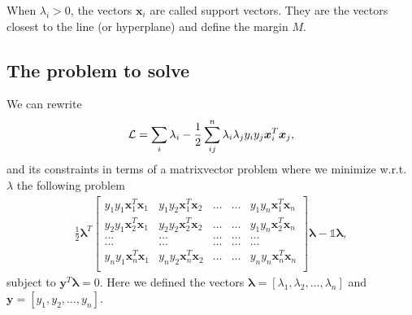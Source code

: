\documentclass[letterpaper,10pt,english]{sphinxmanual}
\begin{document}
When \(\lambda_i > 0\), the vectors \(\boldsymbol{x}_i\) are called support vectors. They are the vectors closest to the line (or hyperplane) and define the margin \(M\).


\subsection{The problem to solve}
\label{\detokenize{chapter7:the-problem-to-solve}}
We can rewrite
\begin{equation*}
\begin{split}
{\cal L}=\sum_i\lambda_i-\frac{1}{2}\sum_{ij}^n\lambda_i\lambda_jy_iy_j\boldsymbol{x}_i^T\boldsymbol{x}_j,
\end{split}
\end{equation*}
and its constraints in terms of a matrix\sphinxhyphen{}vector problem where we minimize w.r.t. \(\lambda\) the following problem
\begin{equation*}
\begin{split}
\frac{1}{2} \boldsymbol{\lambda}^T\begin{bmatrix} y_1y_1\boldsymbol{x}_1^T\boldsymbol{x}_1 & y_1y_2\boldsymbol{x}_1^T\boldsymbol{x}_2 & \dots & \dots & y_1y_n\boldsymbol{x}_1^T\boldsymbol{x}_n \\
y_2y_1\boldsymbol{x}_2^T\boldsymbol{x}_1 & y_2y_2\boldsymbol{x}_2^T\boldsymbol{x}_2 & \dots & \dots & y_1y_n\boldsymbol{x}_2^T\boldsymbol{x}_n \\
\dots & \dots & \dots & \dots & \dots \\
\dots & \dots & \dots & \dots & \dots \\
y_ny_1\boldsymbol{x}_n^T\boldsymbol{x}_1 & y_ny_2\boldsymbol{x}_n^T\boldsymbol{x}_2 & \dots & \dots & y_ny_n\boldsymbol{x}_n^T\boldsymbol{x}_n \\
\end{bmatrix}\boldsymbol{\lambda}-\mathbb{1}\boldsymbol{\lambda},
\end{split}
\end{equation*}
subject to \(\boldsymbol{y}^T\boldsymbol{\lambda}=0\). Here we defined the vectors \(\boldsymbol{\lambda} =[\lambda_1,\lambda_2,\dots,\lambda_n]\) and
\(\boldsymbol{y}=[y_1,y_2,\dots,y_n]\).
\end{document}
